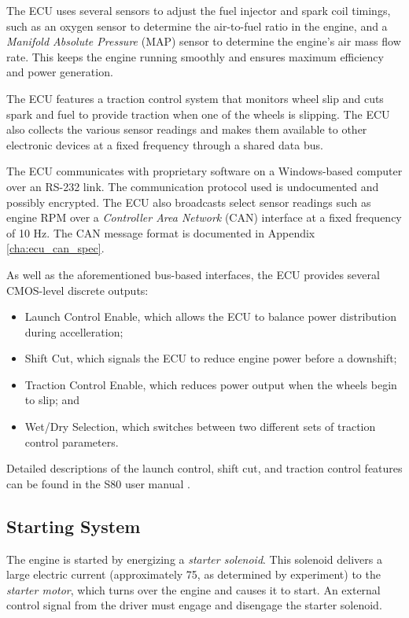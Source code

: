 The ECU uses several sensors to adjust the fuel injector and spark coil timings, such as an oxygen sensor to determine the air-to-fuel ratio in the engine, and a \emph{Manifold Absolute Pressure} (MAP) sensor to determine the engine's air mass flow rate. This keeps the engine running smoothly and ensures maximum efficiency and power generation. 

The ECU features a traction control system that monitors wheel slip and cuts spark and fuel to provide traction when one of the wheels is slipping. The ECU also collects the various sensor readings and makes them available to other electronic devices at a fixed frequency through a shared data bus. 


The ECU communicates with proprietary software on a Windows-based computer over an RS-232 link. The communication protocol used is undocumented and possibly encrypted. The ECU also broadcasts select sensor readings such as engine RPM over a \emph{Controller Area Network} (CAN) interface at a fixed frequency of 10 Hz. The CAN message format is documented in Appendix \ref{cha:ecu_can_spec}.

As well as the aforementioned bus-based interfaces, the ECU provides several CMOS-level discrete outputs:

\begin{itemize}
	\item Launch Control Enable, which allows the ECU to balance power distribution during accelleration;
    \item Shift Cut, which signals the ECU to reduce engine power before a downshift;
    \item Traction Control Enable, which reduces power output when the wheels begin to slip; and
    \item Wet/Dry Selection, which switches between two different sets of traction control parameters.
\end{itemize}

Detailed descriptions of the launch control, shift cut, and traction control features can be found in the S80 user manual \cite{s80pro}.
 
\subsection{Starting System}

The engine is started by energizing a \emph{starter solenoid}. This solenoid delivers a large electric current (approximately \unit{75}{\ampere}, as determined by experiment) to the \emph{starter motor}, which turns over the engine and causes it to start. An external control signal from the driver must engage and disengage the starter solenoid. 


